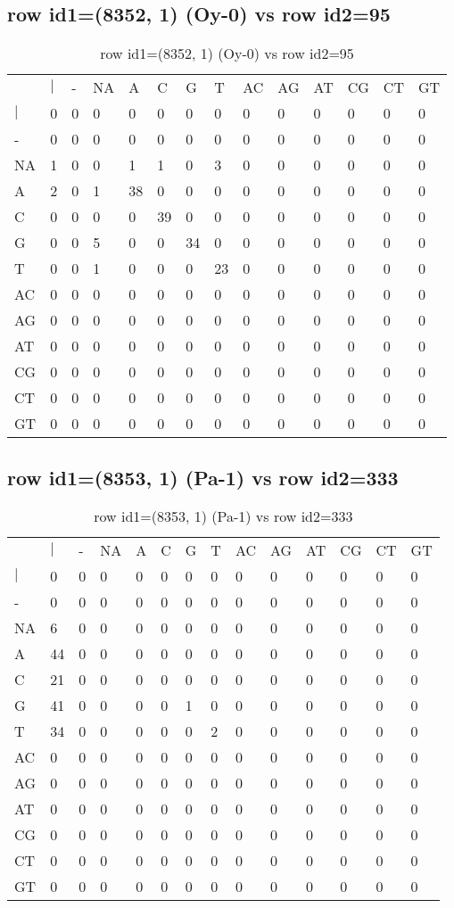 \subsection{row id1=(8352, 1) (Oy-0) vs row id2=95}
\begin{center}
\begin{longtable}{|l|l|l|l|l|l|l|l|l|l|l|l|l|l|}
\caption{row id1=(8352, 1) (Oy-0) vs row id2=95} \label{table_dm564}\\
\hline
\\
\hline
&$|$&-&NA&A&C&G&T&AC&AG&AT&CG&CT&GT\\
$|$&0&0&0&0&0&0&0&0&0&0&0&0&0\\
-&0&0&0&0&0&0&0&0&0&0&0&0&0\\
NA&1&0&0&1&1&0&3&0&0&0&0&0&0\\
A&2&0&1&38&0&0&0&0&0&0&0&0&0\\
C&0&0&0&0&39&0&0&0&0&0&0&0&0\\
G&0&0&5&0&0&34&0&0&0&0&0&0&0\\
T&0&0&1&0&0&0&23&0&0&0&0&0&0\\
AC&0&0&0&0&0&0&0&0&0&0&0&0&0\\
AG&0&0&0&0&0&0&0&0&0&0&0&0&0\\
AT&0&0&0&0&0&0&0&0&0&0&0&0&0\\
CG&0&0&0&0&0&0&0&0&0&0&0&0&0\\
CT&0&0&0&0&0&0&0&0&0&0&0&0&0\\
GT&0&0&0&0&0&0&0&0&0&0&0&0&0\\
\hline
\end{longtable}
\end{center}

\subsection{row id1=(8353, 1) (Pa-1) vs row id2=333}
\begin{center}
\begin{longtable}{|l|l|l|l|l|l|l|l|l|l|l|l|l|l|}
\caption{row id1=(8353, 1) (Pa-1) vs row id2=333} \label{table_dm566}\\
\hline
\\
\hline
&$|$&-&NA&A&C&G&T&AC&AG&AT&CG&CT&GT\\
$|$&0&0&0&0&0&0&0&0&0&0&0&0&0\\
-&0&0&0&0&0&0&0&0&0&0&0&0&0\\
NA&6&0&0&0&0&0&0&0&0&0&0&0&0\\
A&44&0&0&0&0&0&0&0&0&0&0&0&0\\
C&21&0&0&0&0&0&0&0&0&0&0&0&0\\
G&41&0&0&0&0&1&0&0&0&0&0&0&0\\
T&34&0&0&0&0&0&2&0&0&0&0&0&0\\
AC&0&0&0&0&0&0&0&0&0&0&0&0&0\\
AG&0&0&0&0&0&0&0&0&0&0&0&0&0\\
AT&0&0&0&0&0&0&0&0&0&0&0&0&0\\
CG&0&0&0&0&0&0&0&0&0&0&0&0&0\\
CT&0&0&0&0&0&0&0&0&0&0&0&0&0\\
GT&0&0&0&0&0&0&0&0&0&0&0&0&0\\
\hline
\end{longtable}
\end{center}

